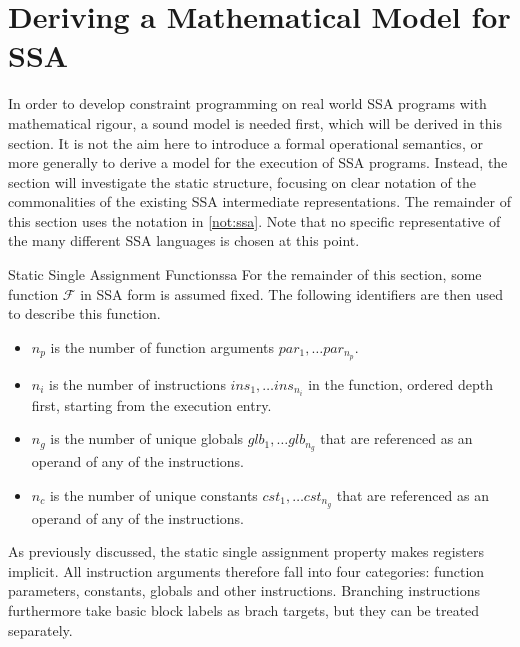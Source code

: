 \pagebreak

\section{Deriving a Mathematical Model for SSA}

    In order to develop constraint programming on real world SSA programs with
    mathematical rigour, a sound model is needed first, which will be derived in
    this section.
    It is not the aim here to introduce a formal operational semantics, or more
    generally to derive a model for the execution of SSA programs.
    Instead, the section will investigate the static structure, focusing on
    clear notation of the commonalities of the existing SSA intermediate
    representations.
    The remainder of this section uses the notation in \autoref{not:ssa}.
    Note that no specific representative of the many different SSA languages is
    chosen at this point.

\begin{notation}{Static Single Assignment Function}{ssa}
    For the remainder of this section, some function $\mathcal F$ in SSA form is
    assumed fixed. 
    The following identifiers are then used to describe this function.

    \begin{itemize}
    \item $n_p$ is the number of function arguments $par_1,\dots par_{n_p}$.
    \item $n_i$ is the number of instructions $ins_1,\dots ins_{n_i}$ in the
          function, ordered depth first, starting from the execution entry.
    \item $n_g$ is the number of unique globals $glb_1,\dots glb_{n_g}$ that are
          referenced as an operand of any of the instructions.
    \item $n_c$ is the number of unique constants $cst_1,\dots cst_{n_g}$ that
          are referenced as an operand of any of the instructions.
    \end{itemize}
\end{notation}

    As previously discussed, the static single assignment property makes
    registers implicit.
    All instruction arguments therefore fall into four categories: function
    parameters, constants, globals and other instructions.
    Branching instructions furthermore take basic block labels as brach targets,
    but they can be treated separately.

